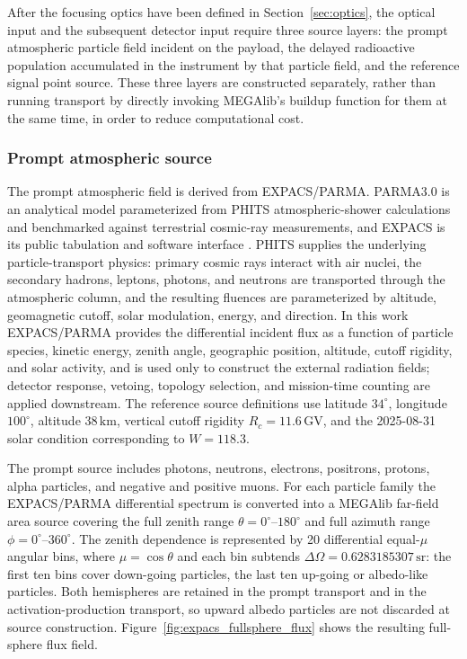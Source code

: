 \documentclass[11pt]{article}
\begin{document}
After the focusing optics have been defined in Section~\ref{sec:optics}, the
optical input and the subsequent detector input require three source layers: the
prompt atmospheric particle field incident on the payload, the delayed
radioactive population accumulated in the instrument by that particle field, and
the reference signal point source. These three layers are constructed
separately, rather than running transport by directly invoking MEGAlib's buildup
function for them at the same time, in order to reduce computational cost.

\subsubsection{Prompt atmospheric source}
\label{subsec:prompt_source}

The prompt atmospheric field is derived from EXPACS/PARMA. PARMA3.0 is an
analytical model parameterized from PHITS atmospheric-shower calculations and
benchmarked against terrestrial cosmic-ray measurements, and EXPACS is its
public tabulation and software interface
\cite{Sato2015EXPACS,Sato2016PARMA4}. PHITS supplies the underlying
particle-transport physics: primary cosmic rays interact with air nuclei, the
secondary hadrons, leptons, photons, and neutrons are transported through the
atmospheric column, and the resulting fluences are parameterized by altitude,
geomagnetic cutoff, solar modulation, energy, and direction. In this work
EXPACS/PARMA provides the differential incident flux as a function of particle
species, kinetic energy, zenith angle, geographic position, altitude, cutoff
rigidity, and solar activity, and is used only to construct the external
radiation fields; detector response, vetoing, topology selection, and
mission-time counting are applied downstream. The reference source definitions
use latitude $34^\circ$, longitude $100^\circ$, altitude $38\,\mathrm{km}$,
vertical cutoff rigidity $R_c=11.6\,\mathrm{GV}$, and the 2025-08-31 solar
condition corresponding to $W=118.3$.

The prompt source includes photons, neutrons, electrons, positrons, protons,
alpha particles, and negative and positive muons. For each particle family the
EXPACS/PARMA differential spectrum is converted into a MEGAlib far-field area
source covering the full zenith range $\theta=0^\circ$--$180^\circ$ and full
azimuth range $\phi=0^\circ$--$360^\circ$. The zenith dependence is represented
by 20 differential equal-$\mu$ angular bins, where $\mu=\cos\theta$ and each
bin subtends $\Delta\Omega=0.6283185307\,\mathrm{sr}$: the first ten bins cover
down-going particles, the last ten up-going or albedo-like particles. Both
hemispheres are retained in the prompt transport and in the
activation-production transport, so upward albedo particles are not discarded
at source construction. Figure~\ref{fig:expacs_fullsphere_flux} shows the
resulting full-sphere flux field.
\end{document}
